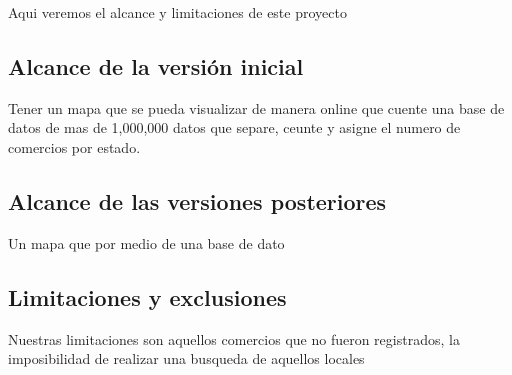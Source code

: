 \documentclass[12pt]{article}
\begin{document}
Aqui veremos el alcance y limitaciones de este proyecto
 
\subsection{Alcance de la versión inicial}\label{ant}

Tener un mapa que se pueda visualizar de manera online que cuente una base de datos de mas de 1,000,000 datos que separe, ceunte y asigne el numero de comercios por estado.


\subsection{Alcance de las versiones posteriores}\label{on}

Un mapa que por medio de una base de dato

\subsection{Limitaciones y exclusiones}\label{occe}

Nuestras limitaciones son aquellos comercios que no fueron registrados, la imposibilidad de realizar una busqueda de aquellos locales 
\end{document}
